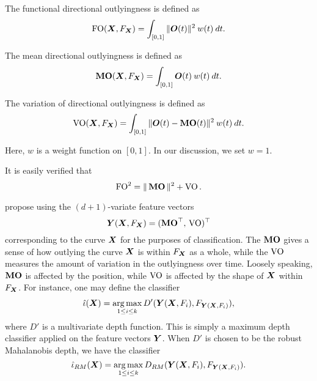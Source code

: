\begin{definition}
    The functional directional outlyingness is defined as
    \begin{equation}
        \operatorname{FO}(\bm{X}, F_{\bm{X}}) = \int_{[0, 1]} \Vert \bm{O}(t) \Vert^2 \:w(t)\:dt.
    \end{equation}
\end{definition}

\begin{definition}
    \label{def:MO}
    The mean directional outlyingness is defined as
    \begin{equation}
        \operatorname{\textbf{MO}}(\bm{X}, F_{\bm{X}}) = \int_{[0, 1]} \bm{O}(t) \:w(t)\:dt.
    \end{equation}
\end{definition}

\begin{definition}
    The variation of directional outlyingness is defined as
    \begin{equation}
        \operatorname{VO}(\bm{X}, F_{\bm{X}}) = \int_{[0, 1]} \Vert \bm{O}(t) - \operatorname{\textbf{MO}}(t) \Vert^2 \:w(t)\:dt.
    \end{equation}
\end{definition}

Here, $w$ is a weight function on $[0, 1]$.
In our discussion, we set $w = 1$.

It is easily verified that
\begin{equation}
    \operatorname{FO}^2 = \Vert \operatorname{\textbf{MO}} \Vert^2 + \operatorname{VO}.
\end{equation}

\textcite{dai-genton-2018} propose using the $(d + 1)$-variate feature vectors
\begin{equation}
    \bm{Y}(\bm{X}, F_{\bm{X}}) = (\operatorname{\textbf{MO}}^\top,\, \operatorname{VO})^\top
\end{equation}
corresponding to the curve $\bm{X}$ for the purposes of classification.
The $\operatorname{\textbf{MO}}$ gives a sense of how outlying the curve $\bm{X}$ is within $F_{\bm{X}}$ as
a whole, while the $\operatorname{VO}$ measures the amount of variation in the outlyingness
over time.
Loosely speaking, $\operatorname{\textbf{MO}}$ is affected by the position, while $\operatorname{VO}$ is affected
by the shape of $\bm{X}$ within $F_{\bm{X}}$.
For instance, one may define the classifier
\begin{equation}
    \hat{\iota}(\bm{X}) = \operatorname*{arg\,max}_{1 \leq i \leq k} D'(\bm{Y}(\bm{X}, F_i), F_{\bm{Y}(\bm{X}, F_i)}),
\end{equation}
where $D'$ is a multivariate depth function.
This is simply a maximum depth classifier applied on the feature vectors
$\bm{Y}$.
When $D'$ is chosen to be the robust Mahalanobis depth, we have the classifier
\begin{equation}
    \hat{\iota}_{RM}(\bm{X}) = \operatorname*{arg\,max}_{1 \leq i \leq k} D_{RM}(\bm{Y}(\bm{X}, F_i), F_{\bm{Y}(\bm{X}, F_i)}).
\end{equation}


